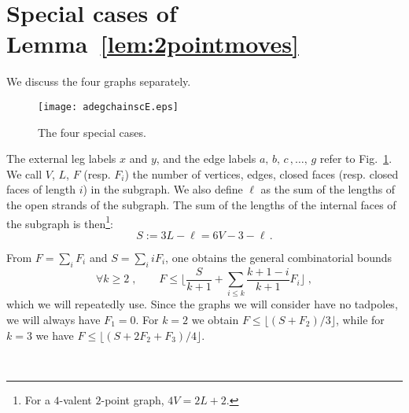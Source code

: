 \documentclass[10pt]{article}
\theoremstyle{plain}
\theoremstyle{definition}
\newcommand{\be}{\begin{equation}}
\newcommand{\ee}{\end{equation}}
\begin{document}
\section{Special cases of Lemma~\ref{lem:2pointmoves} }\label{app:Specialcases}


We discuss the four graphs separately. 

 \begin{figure}[htb]
 \begin{center}
 \texttt{[image: adegchainscE.eps]}  
 \caption{The four special cases.} \label{fig:adegchainss}
 \end{center}
 \end{figure}


The external leg labels $x$ and $y$, and the edge labels $a,\, b, \, c\,, \ldots, \,g$ refer to Fig.~\ref{fig:adegchainss}. We call $V$, $L$, $F$ (resp. $F_i$) the number of vertices, edges, closed faces (resp. closed faces of length $i$)
in the subgraph. We also define $\ell$ as the sum of the lengths of the open strands of the subgraph. The sum of the lengths of the internal faces of the subgraph is then\footnote{For a $4$-valent $2$-point graph, $4V = 2 L + 2$.}:
\be
S := 3 L - \ell = 6 V - 3 - \ell\,.
\ee

From $F = \sum_i F_i$ and $S = \sum_i i F_i$, one obtains the general combinatorial bounds
\be\label{ineq_H}
\forall k \geq 2\;, \qquad F \leq \lfloor \frac{S}{k+1} + \sum_{i\leq k} \frac{k+1-i}{k+1} F_i \rfloor \;,
\ee
which we will repeatedly use. Since the graphs we will consider have no tadpoles, we will always have $F_1=0$. For $k=2$ we obtain $F \leq \lfloor (S+F_2) /3 \rfloor$, while for $k=3$ we have $F \leq \lfloor ( S + 2 F_2 + F_3) /4 \rfloor $.

\
\end{document}
